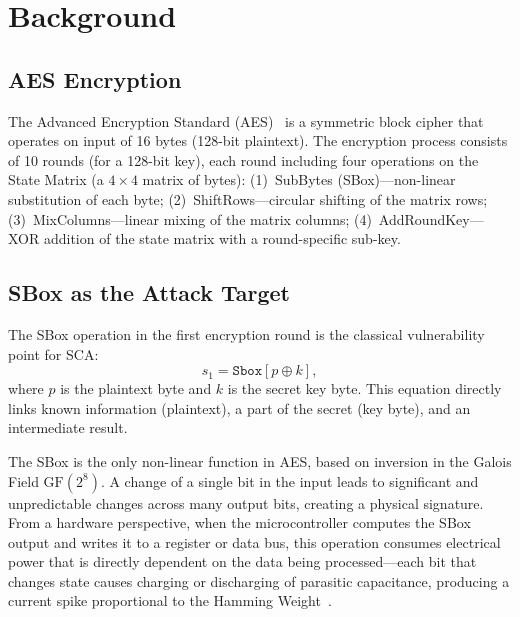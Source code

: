 \documentclass[runningheads]{llncs}
\newcommand{\Sbox}{\mathtt{Sbox}}
\newcommand{\GF}{\mathrm{GF}}
\begin{document}
\section{Background}\label{sec:background}

\subsection{AES Encryption}

The Advanced Encryption Standard (AES)~\cite{fips197} is a symmetric block cipher that operates on input of 16 bytes (128-bit plaintext).
The encryption process consists of 10 rounds (for a 128-bit key), each round including four operations on the State Matrix (a $4 \times 4$ matrix of bytes):
(1)~SubBytes (SBox)---non-linear substitution of each byte;
(2)~ShiftRows---circular shifting of the matrix rows;
(3)~MixColumns---linear mixing of the matrix columns;
(4)~AddRoundKey---XOR addition of the state matrix with a round-specific sub-key.

\subsection{SBox as the Attack Target}

The SBox operation in the first encryption round is the classical vulnerability point for SCA:
\begin{equation}\label{eq:sbox}
  s_1 = \Sbox[p \oplus k],
\end{equation}
where $p$ is the plaintext byte and $k$ is the secret key byte.
This equation directly links known information (plaintext), a part of the secret (key byte), and an intermediate result.

The SBox is the only non-linear function in AES, based on inversion in the Galois Field $\GF(2^8)$.
A change of a single bit in the input leads to significant and unpredictable changes across many output bits, creating a physical signature.
From a hardware perspective, when the microcontroller computes the SBox output and writes it to a register or data bus, this operation consumes electrical power that is directly dependent on the data being processed---each bit that changes state causes charging or discharging of parasitic capacitance, producing a current spike proportional to the Hamming Weight~\cite{mangard2007power}.
\end{document}
